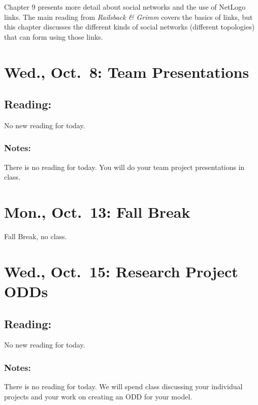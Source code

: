 \documentclass[
]{article}
\begin{document}
Chapter 9 presents more detail about social networks and the use of
NetLogo links. The main reading from \emph{Railsback \& Grimm} covers
the basics of links, but this chapter discusses the different kinds of
social networks (different topologies) that can form using those links.

\section{Wed., Oct.~8: Team
Presentations}\label{wed.-oct.-8-team-presentations}

\subsection{Reading:}\label{reading-14}

No new reading for today.

\subsubsection{Notes:}\label{notes}

There is no reading for today. You will do your team project
presentations in class.

\section{Mon., Oct.~13: Fall Break}\label{mon.-oct.-13-fall-break}

Fall Break, no class.

\section{Wed., Oct.~15: Research Project
ODDs}\label{wed.-oct.-15-research-project-odds}

\subsection{Reading:}\label{reading-15}

No new reading for today.

\subsubsection{Notes:}\label{notes-1}

There is no reading for today. We will spend class discussing your
individual projects and your work on creating an ODD for your model.
\end{document}
